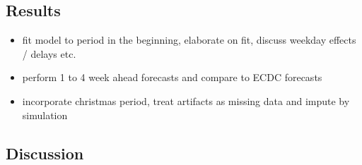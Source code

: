 \subsection{Results}

\begin{itemize}
    \item fit model to period in the beginning, elaborate on fit, discuss weekday effects / delays etc.
    \item perform 1 to 4 week ahead forecasts and compare to ECDC forecasts
    \item incorporate christmas period, treat artifacts as missing data and impute by simulation
\end{itemize}

\subsection{Discussion}
